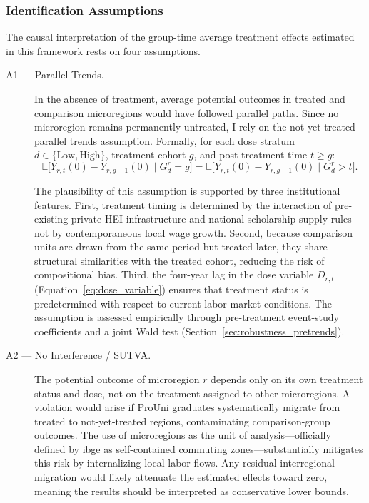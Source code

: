 \subsubsection{Identification Assumptions}
\label{sec:assumptions}

The causal interpretation of the group-time average treatment effects estimated in this framework rests on four assumptions.

\begin{description}

\item[A1 --- Parallel Trends.]
In the absence of treatment, average potential outcomes in treated and comparison microregions would have followed parallel paths. Since no microregion remains permanently untreated, I rely on the not-yet-treated parallel trends assumption. Formally, for each dose stratum $d \in \{\text{Low}, \text{High}\}$, treatment cohort $g$, and post-treatment time $t \geq g$:
\begin{equation}
    \mathbb{E}\bigl[Y_{r,t}(0) - Y_{r,g-1}(0) \mid G_d^r = g\bigr]
    =
    \mathbb{E}\bigl[Y_{r,t}(0) - Y_{r,g-1}(0) \mid G_d^r > t\bigr].
    \label{eq:pt}
\end{equation}

The plausibility of this assumption is supported by three institutional features. First, treatment timing is determined by the interaction of pre-existing private HEI infrastructure and national scholarship supply rules---not by contemporaneous local wage growth. Second, because comparison units are drawn from the same period but treated later, they share structural similarities with the treated cohort, reducing the risk of compositional bias. Third, the four-year lag in the dose variable $D_{r,t}$ (Equation~\ref{eq:dose_variable}) ensures that treatment status is predetermined with respect to current labor market conditions. The assumption is assessed empirically through pre-treatment event-study coefficients and a joint Wald test (Section~\ref{sec:robustness_pretrends}).

\item[A2 --- No Interference / SUTVA.]
The potential outcome of microregion $r$ depends only on its own treatment status and dose, not on the treatment assigned to other microregions. A violation would arise if ProUni graduates systematically migrate from treated to not-yet-treated regions, contaminating comparison-group outcomes. The use of microregions as the unit of analysis---officially defined by \acrshort{ibge} as self-contained commuting zones---substantially mitigates this risk by internalizing local labor flows. Any residual interregional migration would likely attenuate the estimated effects toward zero, meaning the results should be interpreted as conservative lower bounds.


\end{description}
